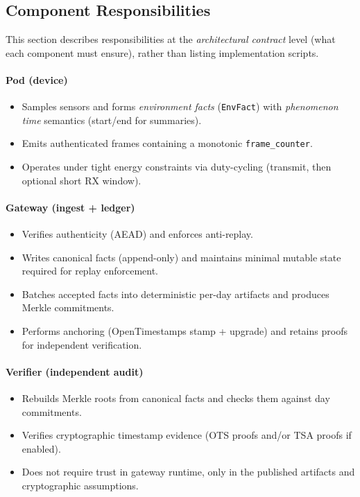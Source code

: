 
\subsection{Component Responsibilities}
\label{subsec:arch-responsibilities}

This section describes responsibilities at the \emph{architectural contract} level (what each component must ensure), rather than listing implementation scripts.

\paragraph{Pod (device)}
\begin{itemize}[nosep]
\item Samples sensors and forms \emph{environment facts} (\texttt{EnvFact}) with \emph{phenomenon time} semantics (start/end for summaries).
\item Emits authenticated frames containing a monotonic \texttt{frame\_counter}.
\item Operates under tight energy constraints via duty-cycling (transmit, then optional short RX window).
\end{itemize}

\paragraph{Gateway (ingest + ledger)}
\begin{itemize}[nosep]
\item Verifies authenticity (\ac{AEAD}) and enforces anti-replay.
\item Writes canonical facts (append-only) and maintains minimal mutable state required for replay enforcement.
\item Batches accepted facts into deterministic per-day artifacts and produces Merkle commitments.
\item Performs anchoring (OpenTimestamps stamp + upgrade) and retains proofs for independent verification.
\end{itemize}

\paragraph{Verifier (independent audit)}
\begin{itemize}[nosep]
\item Rebuilds Merkle roots from canonical facts and checks them against day commitments.
\item Verifies cryptographic timestamp evidence (\ac{OTS} proofs and/or \ac{TSA} proofs if enabled).
\item Does not require trust in gateway runtime, only in the published artifacts and cryptographic assumptions.
\end{itemize}


